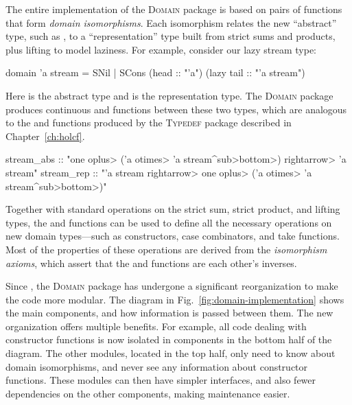 The entire implementation of the \textsc{Domain} package is based on pairs of functions that form \emph{domain isomorphisms}. Each isomorphism relates the new ``abstract'' type, such as , to a ``representation'' type built from strict sums and products, plus lifting to model laziness. For example, consider our lazy stream type:
%
\begin{isacode}
domain 'a stream = SNil | SCons (head :: "'a") (lazy tail :: "'a stream")
\end{isacode}
%
Here  is the abstract type and  is the representation type. The \textsc{Domain} package produces continuous  and  functions between these two types, which are analogous to the  and  functions produced by the \textsc{Typedef} package described in Chapter~\ref{ch:holcf}.
%
\begin{isacodes}
stream_abs :: "one \<oplus> ('a \<otimes> 'a stream\<^sub>\<bottom>) \<rightarrow> 'a stream"
stream_rep :: "'a stream \<rightarrow> one \<oplus> ('a \<otimes> 'a stream\<^sub>\<bottom>)"
\end{isacodes}
%
Together with standard operations on the strict sum, strict product, and lifting types, the  and  functions can be used to define all the necessary operations on new domain types---such as constructors, case combinators, and take functions. Most of the properties of these operations are derived from the \emph{isomorphism axioms}, which assert that the  and  functions are each other's inverses.

Since , the \textsc{Domain} package has undergone a significant reorganization to make the code more modular. The diagram in Fig.~\ref{fig:domain-implementation} shows the main components, and how information is passed between them. The new organization offers multiple benefits. For example, all code dealing with constructor functions is now isolated in components in the bottom half of the diagram. The other modules, located in the top half, only need to know about domain isomorphisms, and never see any information about constructor functions. These modules can then have simpler interfaces, and also fewer dependencies on the other components, making maintenance easier.

